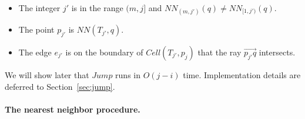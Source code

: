 \documentclass[10pt,a4paper]{amsart}
\newcommand{\ovar}[1]{\overrightarrow{#1}}
\newcommand{\Cell}{\mathit{Cell}}
\newcommand{\NN}{\mathit{NN}}
\begin{document}
{\begin{itemize}
\begin{itemize}
\begin{itemize}
    \setlength{\itemsep}{1pt}
    \setlength{\parskip}{0pt}
    \setlength{\parsep}{0pt} 
         \item The integer $j'$ is in the range $(m,  j]$ and 
         $\NN_{(m,j')}(q) \not = \NN_{[1,j')}(q)$.
         \item The point $p_{j'}$ is $ \NN(T_{j'},q)$.
         \item The edge $e_{j'}$ is on the boundary of $\Cell(T_{j'},p_j)$ that the ray $\ovar{p_{j'}q}$ intersects.
 \end{itemize}   
 	\end{itemize}
 \end{itemize}
 }
 \jumpdef
We will show later that $Jump$ runs in $O(j-i)$ time. Implementation details are deferred to Section~\ref{sec:jump}.
\paragraph*{The nearest neighbor procedure.}
\end{document}
